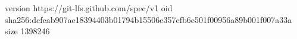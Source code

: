 version https://git-lfs.github.com/spec/v1
oid sha256:dcfcab907ae18394403b01794b15506e357efb6e501f00956a89b001f007a33a
size 1398246
